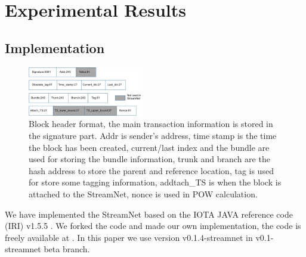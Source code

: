 \section{Experimental Results}

\subsection{Implementation}

\begin{figure}[!ht]
\begin{center}
\includegraphics[width=0.45\textwidth]{figures/block_format.pdf}
    \caption{
        Block header format, the main transaction information is stored in the signature part. Addr is sender's address, time stamp is the time the block has been created, current/last index and the bundle are used for storing the bundle information, trunk and branch are the hash address to store the parent and reference location, tag is used for store some tagging information, addtach\_TS is when the block is attached to the StreamNet, nonce is used in POW calculation.
     }
\label{block_header}
\end{center}
\end{figure}

We have implemented the StreamNet based on the IOTA JAVA reference code (IRI) v1.5.5 \cite{IOTACode}.
We forked the code and made our own implementation, the code is freely available at \cite{StreamNet}.
In this paper we use version v0.1.4-streamnet in v0.1-streamnet beta branch.

